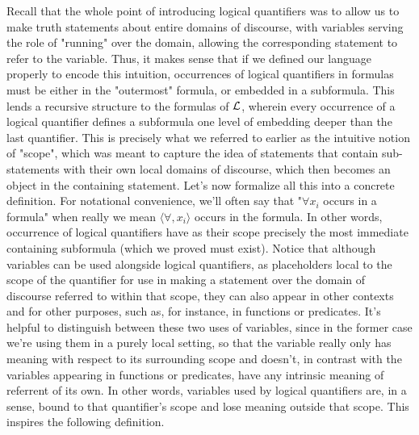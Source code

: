 \documentclass{article}
\begin{document}
Recall that the whole point of introducing logical quantifiers was to allow us to make truth statements about entire domains of discourse, with variables serving the role of "running" over the domain, allowing the corresponding statement to refer to the variable. Thus, it makes sense that if we defined our language properly to encode this intuition, occurrences of logical quantifiers in formulas must be either in the "outermost" formula, or embedded in a subformula. This lends a recursive structure to the formulas of $ \mathcal{L} $, wherein every occurrence of a logical quantifier defines a subformula one level of embedding deeper than the last quantifier. This is precisely what we referred to earlier as the intuitive notion of "scope", which was meant to capture the idea of statements that contain sub-statements with their own local domains of discourse, which then becomes an object in the containing statement. Let's now formalize all this into a concrete definition. For notational convenience, we'll often say that "$ \forall x_i $ occurs in a formula" when really we mean $ \langle \forall, x_i \rangle $ occurs in the formula.
\n
In other words, occurrence of logical quantifiers have as their scope precisely the most immediate containing subformula (which we proved must exist). Notice that although variables can be used alongside logical quantifiers, as placeholders local to the scope of the quantifier for use in making a statement over the domain of discourse referred to within that scope, they can also appear in other contexts and for other purposes, such as, for instance, in functions or predicates. It's helpful to distinguish between these two uses of variables, since in the former case we're using them in a purely local setting, so that the variable really only has meaning with respect to its surrounding scope and doesn't, in contrast with the variables appearing in functions or predicates, have any intrinsic meaning of referrent of its own. In other words, variables used by logical quantifiers are, in a sense, bound to that quantifier's scope and lose meaning outside that scope. This inspires the following definition.
\end{document}
